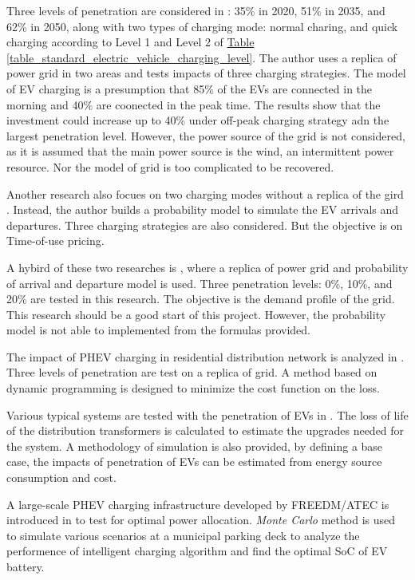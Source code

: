 \documentclass[12pt,a4paper]{report}
\begin{document}
        Three levels of penetration are considered in \cite{paper:PieltainFernandez2011}: 35\% in 2020, 51\% in 2035, and 62\% in 2050, along with two types of charging mode: normal charing, and quick charging according to Level 1 and Level 2 of \hyperref[table_standard_electric_vehicle_charging_level]{Table \ref*{table_standard_electric_vehicle_charging_level}}. The author uses a replica of power grid in two areas and tests impacts of three charging strategies. The model of EV charging is a presumption that 85\% of the EVs are connected in the morning and 40\% are coonected in the peak time. The results show that the investment could increase up to 40\% under off-peak charging strategy adn the largest penetration level. However, the power source of the grid is not considered, as it is assumed that the main power source is the wind, an intermittent power resource. Nor the model of grid is too complicated to be recovered.

        Another research also focues on two charging modes without a replica of the gird \cite{paper:Shao2010}. Instead, the author builds a probability model to simulate the EV arrivals and departures. Three charging strategies are also considered. But the objective is on Time-of-use pricing.

        A hybird of these two researches is \cite{paper:Qian2011}, where a replica of power grid and probability of arrival and departure model is used. Three penetration levels: 0\%, 10\%, and 20\% are tested in this research. The objective is the demand profile of the grid. This research should be a good start of this project. However, the probability model is not able to implemented from the formulas provided.
        
        The impact of PHEV charging in residential distribution network is analyzed in \cite{paper:MousaviAgah2012}. Three levels of penetration are test on a replica of grid. A method based on dynamic programming is designed to minimize the cost function on the loss.

        Various typical systems are tested with the penetration of EVs in \cite{paper:variousimpactofEV}. The loss of life of the distribution transformers is calculated to estimate the upgrades needed for the system. A methodology of simulation is also provided, by defining a base case, the impacts of penetration of EVs can be estimated from energy source consumption and cost.

        A large-scale PHEV charging infrastructure developed by FREEDM/ATEC is introduced in \cite{paper:EVimpactmonte} to test for optimal power allocation. \emph{Monte Carlo} method is used to simulate various scenarios at a municipal parking deck to analyze the performence of intelligent charging algorithm and find the optimal SoC of EV battery.
\end{document}
